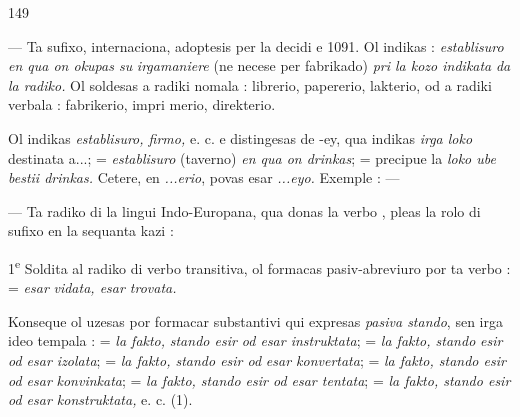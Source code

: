 \begin{VUpage}[153]{149}

 --- Ta sufixo, internaciona, adoptesis per la decidi e 1091. Ol indikas : \textit{establisuro en qua on okupas su}\nl
\textit{irgamaniere} (ne necese per fabrikado) \textit{pri la kozo indikata}\nl
\textit{da la radiko.} Ol soldesas a radiki nomala : librerio,\nl
papererio, lakterio, od a radiki verbala : fabrikerio, impri\cc
merio, direkterio.

Ol indikas \textit{establisuro, firmo,} e. c. e distingesas de -ey,\nl
qua indikas \textit{irga loko} destinata a...;  = \textit{establisuro}\nl
(taverno) \textit{en qua on drinkas};  = precipue la \textit{loko ube}\nl
\textit{bestii drinkas.} Cetere, en \textit{...erio}, povas esar \textit{...eyo.} Exemple : \nl
{} --- \nl
{}\nl
{}

 --- Ta radiko di la lingui Indo-Europana, qua donas\nl
la verbo , pleas la rolo di sufixo en la sequanta kazi :\parplein

1\textsuperscript{e} Soldita al radiko di verbo transitiva, ol formacas\nl
pasiv-abreviuro por ta verbo :  = \textit{esar}\nl
\textit{vidata, esar trovata.}

Konseque ol uzesas por formacar substantivi qui expresas\nl
\textit{pasiva stando}, sen irga ideo tempala :  = \textit{la fakto,}\nl
\textit{stando esir od esar instruktata};  = \textit{la fakto, stando}\nl
\textit{esir od esar izolata};  = \textit{la fakto, stando esir od}\nl
\textit{esar konvertata};  = \textit{la fakto, stando esir od esar}\nl
\textit{konvinkata};  = \textit{la fakto, stando esir od esar tentata};\nl
{} = \textit{la fakto, stando esir od esar konstruktata,}\nl
e. c. (1).


\end{VUpage}
